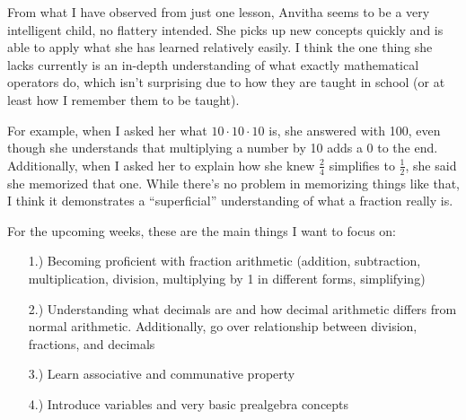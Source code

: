 \documentclass[hidelinks]{article}
\begin{document}
From what I have observed from just one lesson, Anvitha seems to be a very intelligent child, no flattery intended. She picks up new concepts quickly and is able to apply what she has learned relatively easily. I think the one thing she lacks currently is an in-depth understanding of what exactly mathematical operators do, which isn't surprising due to how they are taught in school (or at least how I remember them to be taught). 
\vspace{0.2cm}

\noindent
For example, when I asked her what $10 \cdot 10 \cdot 10$ is, she answered with 100, even though she understands that multiplying a number by 10 adds a 0 to the end. Additionally, when I asked her to explain how she knew $\frac{2}{4}$ simplifies to $\frac{1}{2}$, she said she memorized that one. While there's no problem in memorizing things like that, I think it demonstrates a ``superficial'' understanding of what a fraction really is. 
\vspace{0.2cm}

\noindent
For the upcoming weeks, these are the main things I want to focus on: 
\begin{itemize}
    \item[1.)] Becoming proficient with fraction arithmetic (addition, subtraction, multiplication, division, multiplying by 1 in different forms, simplifying)
    \item[2.)] Understanding what decimals are and how decimal arithmetic differs from normal arithmetic. Additionally, go over relationship between division, fractions, and decimals
    \item[3.)] Learn associative and communative property 
    \item[4.)] Introduce variables and very basic prealgebra concepts 
\end{itemize}
\end{document}
